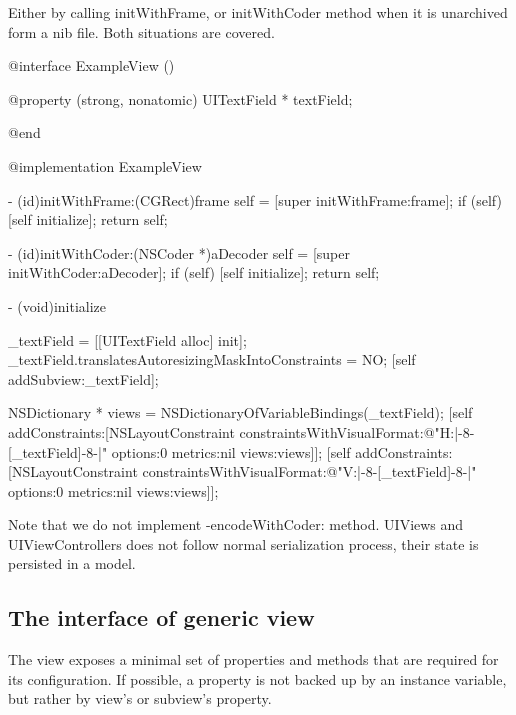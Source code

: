 \documentclass[10pt]{extarticle}
\newenvironment{codelisting}
{\footnotesize\mdframed[middlelinewidth=0.5pt, middlelinecolor=BaliHaiColor, skipabove=15pt]\verbatim}
{\endverbatim\endmdframed\vspace{12pt}\normalsize}
\begin{document}
Either by calling initWithFrame, or initWithCoder method when it is unarchived form a nib file. Both situations are covered.

\begin{codelisting}
@interface ExampleView ()

@property (strong, nonatomic) UITextField * textField;

@end

@implementation ExampleView

- (id)initWithFrame:(CGRect)frame
{
    self = [super initWithFrame:frame];
    if (self) {
        [self initialize];
    }
    return self;
}

- (id)initWithCoder:(NSCoder *)aDecoder
{
    self = [super initWithCoder:aDecoder];
    if (self) {
        [self initialize];
    }
    return self;
}

- (void)initialize
{
    _textField = [[UITextField alloc] init];
    _textField.translatesAutoresizingMaskIntoConstraints = NO;
    [self addSubview:_textField];
    
    NSDictionary * views = NSDictionaryOfVariableBindings(_textField);
    [self addConstraints:[NSLayoutConstraint constraintsWithVisualFormat:@"H:|-8-[_textField]-8-|"
                                                                 options:0
                                                                 metrics:nil
                                                                   views:views]];
    [self addConstraints:[NSLayoutConstraint constraintsWithVisualFormat:@"V:|-8-[_textField]-8-|"
                                                                 options:0
                                                                 metrics:nil
                                                                   views:views]];
}
\end{codelisting}

Note that we do not implement -encodeWithCoder: method. UIViews and UIViewControllers does not follow normal serialization process, their state is persisted in a model.


\subsection{The interface of generic view}

The view exposes a minimal set of properties and methods that are required for its configuration.
If possible, a property is not backed up by an instance variable, but rather by view's or subview's property.
\end{document}

